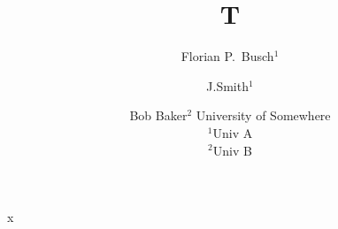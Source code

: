 \documentclass{article}
\begin{document}
\title{T}
\author{Florian P.\ Busch$^{1}$ \and J.\enskip Smith$^{1}$ \and Bob Baker$^{2}$ \quad University of Somewhere\\
$^1$Univ A \\ $^2$Univ B}
\maketitle
x
\end{document}
